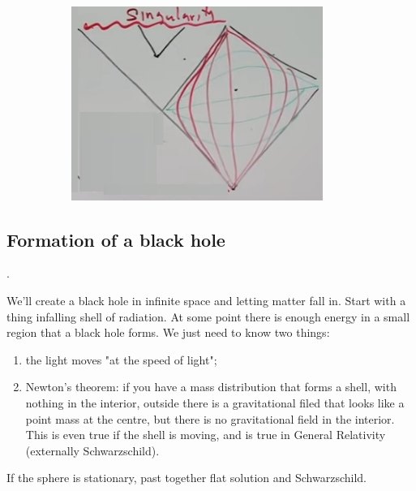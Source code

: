 \documentclass[]{article}
\begin{document}
{\begin{figure}[H]
\begin{center}
\begin{subfigure}[t]{0.3\textwidth}
			\includegraphics[width=0.9\textwidth]{gr-8-penrose-carter-black-hole-physical}
		\end{subfigure}
	\end{center}
\end{figure}


\subsection{Formation of a black hole}.

We'll create a black hole in infinite space and letting matter fall in. Start with a thing infalling shell of radiation. At some point there is enough energy in a small region that a black hole forms. We just need to know two things:
\begin{enumerate}
	\item the light moves "at the speed of light";
	\item Newton's theorem: if you have a mass distribution that forms a shell, with nothing in the interior, outside there is a gravitational filed that looks like a point mass at the centre, but there is no gravitational field in the interior. This is even true if the shell is moving, and is true in General Relativity (externally Schwarzschild).
\end{enumerate}

If the sphere is stationary, past together flat solution and Schwarzschild.

}
\end{document}
